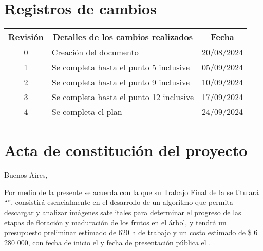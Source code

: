 \documentclass[
11pt, %
]{charter}
\begin{document}
\maketitle
\thispagestyle{empty}
\pagebreak


\thispagestyle{empty}
{\setlength{\parskip}{0pt}
\tableofcontents{}
}
\pagebreak


\section*{Registros de cambios}
\label{sec:registro}


\begin{table}[ht]
\label{tab:registro}
\centering
\begin{tabularx}{\linewidth}{@{}|c|X|c|@{}}
\hline
\rowcolor[HTML]{C0C0C0} 
Revisión & \multicolumn{1}{c|}{\cellcolor[HTML]{C0C0C0}Detalles de los cambios realizados} & Fecha      \\ \hline
0      & Creación del documento                                & {20}/{08}/2024 \\ \hline
1      & Se completa hasta el punto 5 inclusive                & {05}/{09}/2024 \\ \hline
2      & Se completa hasta el punto 9 inclusive                & {10}/{09}/2024 \\ \hline
3      & Se completa hasta el punto 12 inclusive               & {17}/{09}/{2024} \\ \hline
4      & Se completa el plan	                               & {24}/{09}/{2024} \\ \hline


\end{tabularx}
\end{table}

\pagebreak



\section*{Acta de constitución del proyecto}
\label{sec:acta}

\begin{flushright}
Buenos Aires, \fechaInicioName
\end{flushright}

\vspace{2cm}

Por medio de la presente se acuerda con la \authorname\hspace{1px} que su Trabajo Final de la \degreename\hspace{1px} se 
titulará ``\ttitle'', consistirá esencialmente en el desarrollo de un algoritmo que permita descargar y analizar imágenes satelitales para 
determinar el progreso de las etapas de floración y maduración de los frutos en el árbol, y tendrá un presupuesto preliminar estimado de {620} h de trabajo y un costo estimado de
{\$ 6 280 000}, con fecha de inicio el \fechaInicioName\hspace{1px} y fecha de presentación pública 
el \fechaFinalName.
\end{document}
